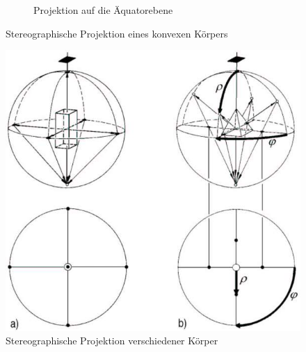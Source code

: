 \begin{figure}
\begin{subfigure}{0.4\textwidth}
	\caption{Projektion auf die Äquatorebene}
\end{subfigure}
\caption{Stereographische Projektion eines konvexen Körpers}
\end{figure}

\begin{figure}
	\centering
	\includegraphics[width=0.8\linewidth]{./pictures/stpr3.jpg}
	\caption{Stereographische Projektion verschiedener Körper}
\end{figure}

